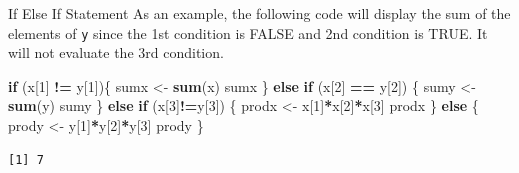 \documentclass[
  ignorenonframetext,
]{beamer}
\newenvironment{Shaded}{\begin{snugshade}}{\end{snugshade}}
\newcommand{\ControlFlowTok}[1]{\textcolor[rgb]{0.13,0.29,0.53}{\textbf{#1}}}
\newcommand{\DecValTok}[1]{\textcolor[rgb]{0.00,0.00,0.81}{#1}}
\newcommand{\FunctionTok}[1]{\textcolor[rgb]{0.13,0.29,0.53}{\textbf{#1}}}
\newcommand{\NormalTok}[1]{#1}
\newcommand{\OtherTok}[1]{\textcolor[rgb]{0.56,0.35,0.01}{#1}}
\newcommand{\SpecialCharTok}[1]{\textcolor[rgb]{0.81,0.36,0.00}{\textbf{#1}}}
\begin{document}
\begin{frame}[fragile]{If Else If Statement}
\label{if-else-if-statement-1}
As an example, the following code will display the sum of the elements
of \texttt{y} since the 1st condition is FALSE and 2nd condition is
TRUE. It will not evaluate the 3rd condition.

\small

\begin{Shaded}
\begin{Highlighting}[]
\ControlFlowTok{if}\NormalTok{ (x[}\DecValTok{1}\NormalTok{] }\SpecialCharTok{!=}\NormalTok{ y[}\DecValTok{1}\NormalTok{])\{}
\NormalTok{   sumx }\OtherTok{\textless{}{-}} \FunctionTok{sum}\NormalTok{(x)}
\NormalTok{   sumx}
\NormalTok{  \} }\ControlFlowTok{else} \ControlFlowTok{if}\NormalTok{ (x[}\DecValTok{2}\NormalTok{] }\SpecialCharTok{==}\NormalTok{ y[}\DecValTok{2}\NormalTok{]) \{}
\NormalTok{   sumy }\OtherTok{\textless{}{-}} \FunctionTok{sum}\NormalTok{(y)}
\NormalTok{   sumy}
\NormalTok{   \} }\ControlFlowTok{else} \ControlFlowTok{if}\NormalTok{ (x[}\DecValTok{3}\NormalTok{]}\SpecialCharTok{!=}\NormalTok{y[}\DecValTok{3}\NormalTok{]) \{}
\NormalTok{   prodx }\OtherTok{\textless{}{-}}\NormalTok{ x[}\DecValTok{1}\NormalTok{]}\SpecialCharTok{*}\NormalTok{x[}\DecValTok{2}\NormalTok{]}\SpecialCharTok{*}\NormalTok{x[}\DecValTok{3}\NormalTok{]}
\NormalTok{   prodx}
\NormalTok{   \} }\ControlFlowTok{else}\NormalTok{ \{}
\NormalTok{   prody }\OtherTok{\textless{}{-}}\NormalTok{ y[}\DecValTok{1}\NormalTok{]}\SpecialCharTok{*}\NormalTok{y[}\DecValTok{2}\NormalTok{]}\SpecialCharTok{*}\NormalTok{y[}\DecValTok{3}\NormalTok{]}
\NormalTok{   prody}
\NormalTok{\}}
\end{Highlighting}
\end{Shaded}

\begin{verbatim}
[1] 7
\end{verbatim}

\normalsize
\end{frame}
\end{document}
